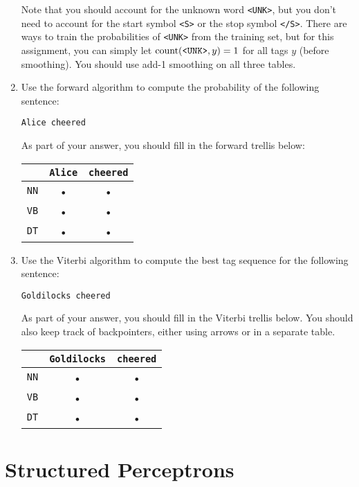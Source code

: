 \documentclass[11pt,letterpaper]{article}
\begin{document}
\begin{enumerate}
Note that you should account for the unknown word \texttt{<UNK>}, but you don't need to account for the start symbol \texttt{<S>} or the stop symbol \texttt{</S>}. There are ways to train the probabilities of \texttt{<UNK>} from the training set, but for this assignment, you can simply let $\textnormal{count}(\texttt{<UNK>},y)=1$ for all tags $y$ (before smoothing). You should use add-1 smoothing on all three tables.

\item Use the forward algorithm to compute the probability of the following sentence:

\texttt{Alice cheered}

As part of your answer, you should fill in the forward trellis below:
\begin{center}
\begin{tabular}{|c|c|c|}
\hline 
 & \texttt{Alice} & \texttt{cheered} \\ 
\hline 
\texttt{NN} & • & • \\ 
\hline 
\texttt{VB} & • & • \\ 
\hline 
\texttt{DT} & • & • \\ 
\hline 
\end{tabular} 
\end{center}

\item Use the Viterbi algorithm to compute the best tag sequence for the following sentence:

\texttt{Goldilocks cheered}

As part of your answer, you should fill in the Viterbi trellis below. You should also keep track of backpointers, either using arrows or in a separate table.
\begin{center}
\begin{tabular}{|c|c|c|}
\hline 
& \texttt{Goldilocks} & \texttt{cheered} \\ 
\hline 
\texttt{NN} & • & • \\ 
\hline 
\texttt{VB} & • & • \\ 
\hline 
\texttt{DT} & • & • \\ 
\hline 
\end{tabular} 
\end{center}

\end{enumerate}\newpage

\section{Structured Perceptrons}
\end{document}
